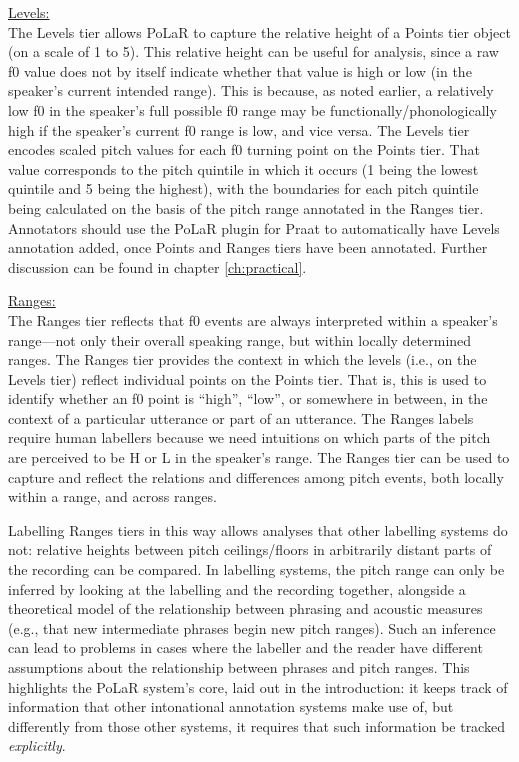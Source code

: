 \uline{Levels:}\\ The Levels tier allows PoLaR to capture the relative height of a Points tier object (on a scale of 1 to 5). This relative height can be useful for analysis, since a raw f0 value does not by itself indicate whether that value is high or low (in the speaker’s current intended range). This is because, as noted earlier, a relatively low f0 in the speaker’s full possible f0 range may be functionally\slash phonologically high if the speaker’s current f0 range is low, and vice versa. The Levels tier encodes scaled pitch values for each f0 turning point on the Points tier. That value corresponds to the pitch quintile in which it occurs (1 being the lowest quintile and 5 being the highest), with the boundaries for each pitch quintile being calculated on the basis of the pitch range annotated in the Ranges tier. Annotators should use the PoLaR plugin for Praat to automatically have Levels annotation added, once Points and Ranges tiers have been annotated. Further discussion can be found in chapter \ref{ch:practical}.

\uline{Ranges:}\\ The Ranges tier reflects that f0 events are always interpreted within a speaker’s range—not only their overall speaking range, but within locally determined ranges. The Ranges tier provides the context in which the levels (i.e., on the Levels tier) reflect individual points on the Points tier. That is, this is used to identify whether an f0 point is “high”, “low”, or somewhere in between, in the context of a particular utterance or part of an utterance. The Ranges labels require human labellers because we need intuitions on which parts of the pitch are perceived to be H or L in the speaker’s range. The Ranges tier can be used to capture and reflect the relations and differences among pitch events, both locally within a range, and across ranges.

Labelling Ranges tiers in this way allows analyses that other \DIFdelbegin {}\DIFdelend \DIFaddbegin {}\DIFaddend labelling systems do not: relative heights between pitch ceilings\slash floors in arbitrarily distant parts of the recording can be compared. In \DIFdelbegin {}\DIFdelend \DIFaddbegin {}\DIFaddend labelling systems, the pitch range can only be inferred by looking at the labelling and the recording together, alongside a theoretical model of the relationship between phrasing and acoustic measures (e.g., that new intermediate phrases begin new pitch ranges). Such an inference can lead to problems in cases where the labeller and the reader have different assumptions about the relationship between phrases and pitch ranges. This highlights the PoLaR system’s core, laid out in the introduction: it keeps track of information that other intonational annotation systems make use of, but differently from those other systems, it requires that such information be tracked \emph{explicitly}.

